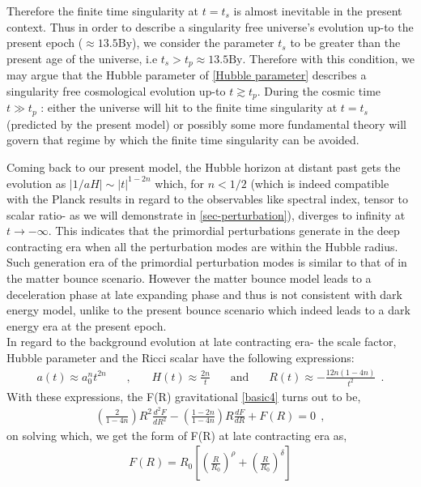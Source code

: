 \documentclass{article}
\begin{document}
Therefore the finite time singularity at $t = t_s$ is almost inevitable in the present context. Thus in order to describe a singularity free universe's 
evolution up-to the present epoch ($\approx 13.5\mathrm{By}$), we consider the parameter $t_s$ to be greater than the present age of the universe, 
i.e $t_s > t_p \approx 13.5\mathrm{By}$. Therefore with this condition, we may argue that the Hubble parameter of \ref{Hubble parameter} 
describes a singularity free cosmological evolution up-to $t \gtrsim t_p$. During the cosmic time $t \gg t_p$ : either the universe will hit to the 
finite time singularity at $t = t_s$ (predicted by the present model) 
or possibly some more fundamental theory will govern that regime by which the finite time singularity can be avoided. 

Coming back to our present model, the Hubble horizon at distant past gets the evolution as $|1/aH| \sim |t|^{1-2n}$ which, for $n < 1/2$ (which is 
indeed compatible with the Planck results in regard to the observables like spectral index, tensor to scalar ratio- as we will demonstrate in 
\ref{sec-perturbation}), 
diverges to infinity at $t \rightarrow -\infty$. This indicates that the primordial perturbations generate in the deep contracting era when 
all the perturbation modes are within the Hubble radius. Such generation era of the primordial perturbation modes is similar to that of in the matter 
bounce scenario. However the matter bounce model leads to a deceleration phase at late expanding phase and thus is 
not consistent with dark energy model, unlike to the present bounce scenario which indeed leads to a dark energy era 
at the present epoch.\\ 
In regard to the background evolution at late contracting era- the scale factor, Hubble parameter and the Ricci scalar 
have the following expressions:
\begin{eqnarray}
 a(t) \approx a_0^nt^{2n}~~~~~~~~,~~~~~~~~H(t) \approx \frac{2n}{t}~~~~~~~~\mathrm{and}~~~~~~~~R(t) \approx -\frac{12n(1-4n)}{t^2}~~.
 \label{late contracting expressions}
\end{eqnarray}
With these expressions, the F(R) gravitational \ref{basic4} turns out to be, 
\begin{eqnarray}
 \left(\frac{2}{1 - 4n}\right)R^2\frac{d^2F}{dR^2} - \left(\frac{1 - 2n}{1 - 4n}\right)R\frac{dF}{dR} + F(R) = 0~~,
 \label{gravitational equation-late contracting}
\end{eqnarray}
on solving which, we get the form of F(R) at late contracting era as,
\begin{eqnarray}
 F(R) = R_0\left[\left(\frac{R}{R_0}\right)^{\rho} + \left(\frac{R}{R_0}\right)^{\delta}\right]
 \label{FR solution-late contracting}
\end{eqnarray}
\end{document}
